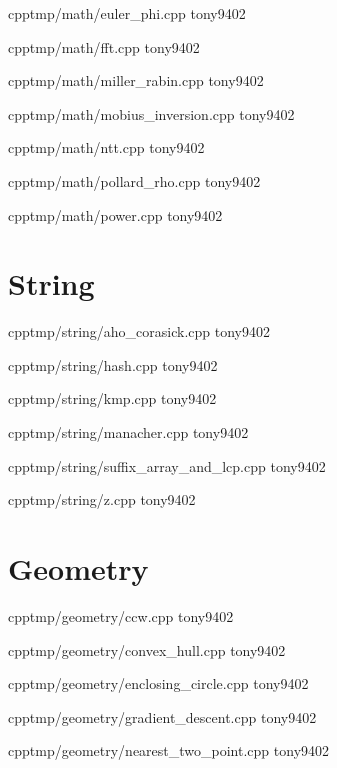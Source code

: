 {}
{}
{}
{cpp}{tmp/math/euler_phi.cpp}
{tony9402}



{}
{}
{}
{cpp}{tmp/math/fft.cpp}
{tony9402}



{}
{}
{}
{cpp}{tmp/math/miller_rabin.cpp}
{tony9402}



{}
{}
{}
{cpp}{tmp/math/mobius_inversion.cpp}
{tony9402}



{}
{}
{}
{cpp}{tmp/math/ntt.cpp}
{tony9402}



{}
{}
{}
{cpp}{tmp/math/pollard_rho.cpp}
{tony9402}



{}
{}
{}
{cpp}{tmp/math/power.cpp}
{tony9402}


\section{String}


{}
{}
{}
{cpp}{tmp/string/aho_corasick.cpp}
{tony9402}



{}
{}
{}
{cpp}{tmp/string/hash.cpp}
{tony9402}



{}
{}
{}
{cpp}{tmp/string/kmp.cpp}
{tony9402}



{}
{}
{}
{cpp}{tmp/string/manacher.cpp}
{tony9402}



{}
{}
{}
{cpp}{tmp/string/suffix_array_and_lcp.cpp}
{tony9402}



{}
{}
{}
{cpp}{tmp/string/z.cpp}
{tony9402}


\section{Geometry}


{}
{}
{}
{cpp}{tmp/geometry/ccw.cpp}
{tony9402}



{}
{}
{}
{cpp}{tmp/geometry/convex_hull.cpp}
{tony9402}



{}
{}
{}
{cpp}{tmp/geometry/enclosing_circle.cpp}
{tony9402}



{}
{}
{}
{cpp}{tmp/geometry/gradient_descent.cpp}
{tony9402}



{}
{}
{}
{cpp}{tmp/geometry/nearest_two_point.cpp}
{tony9402}

